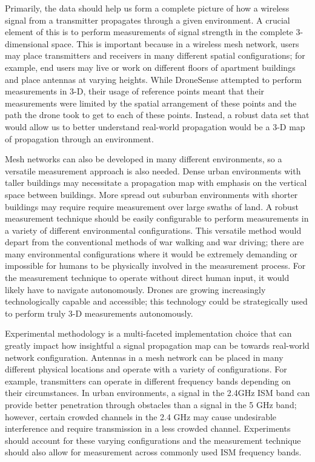 \documentclass[pageno]{jpaper}
\begin{document}
Primarily, the data should help us form a complete picture of how a wireless signal from a transmitter propagates through a given environment. A crucial element of this is to perform measurements of signal strength in the complete 3-dimensional space. This is important because in a wireless mesh network, users may place transmitters and receivers in many different spatial configurations; for example, end users may live or work on different floors of apartment buildings and place antennas at varying heights. While DroneSense attempted to perform measurements in 3-D, their usage of reference points meant that their measurements were limited by the spatial arrangement of these points and the path the drone took to get to each of these points. Instead, a robust data set that would allow us to better understand real-world propagation would be a 3-D map of propagation through an environment.

Mesh networks can also be developed in many different environments, so a versatile measurement approach is also needed. Dense urban environments with taller buildings may necessitate a propagation map with emphasis on the vertical space between buildings. More spread out suburban environments with shorter buildings may require require measurement over large swaths of land. A robust measurement technique should be easily configurable to perform measurements in a variety of different environmental configurations. This versatile method would  depart from the conventional methods of war walking and war driving; there are many environmental configurations where it would be extremely demanding or impossible for humans to be physically involved in the measurement process. For the measurement technique to operate without direct human input, it would likely have to navigate autonomously. Drones are growing increasingly technologically capable and accessible; this technology could be strategically used to perform truly 3-D measurements autonomously. 

Experimental methodology is a  multi-faceted implementation choice that can greatly impact how insightful a signal propagation map can be towards real-world network configuration. Antennas in a mesh network can be placed in many different physical locations and operate with a variety of configurations. For example, transmitters can operate in different frequency bands depending on their circumstances. In urban environments, a signal in the 2.4GHz ISM band can provide better penetration through obstacles than a signal in the 5 GHz band; however, certain crowded channels in the 2.4 GHz may cause undesirable interference and require transmission in a less crowded channel. Experiments should account for these varying configurations and the measurement technique should also allow for measurement across commonly used ISM frequency bands. 
\end{document}
